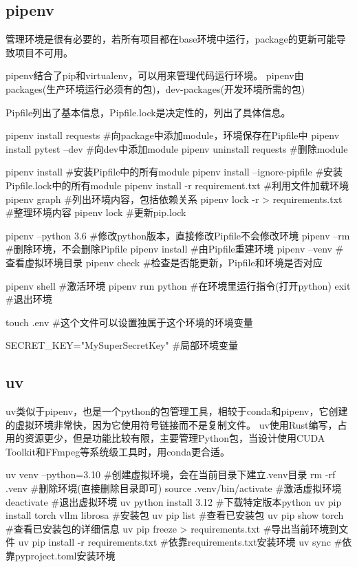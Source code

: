 \subsection{pipenv}
管理环境是很有必要的，若所有项目都在base环境中运行，package的更新可能导致项目不可用。

pipenv结合了pip和virtualenv，可以用来管理代码运行环境。
pipenv由packages(生产环境运行必须有的包)，dev-packages(开发环境所需的包)

Pipfile列出了基本信息，Pipfile.lock是决定性的，列出了具体信息。
\begin{codeblock}[language=python, caption={pipenv}]
  pipenv install requests #向package中添加module，环境保存在Pipfile中
  pipenv install pytest --dev #向dev中添加module
  pipenv uninstall requests #删除module
  
  pipenv install #安装Pipfile中的所有module
  pipenv install --ignore-pipfile #安装Pipfile.lock中的所有module
  pipenv install -r requirement.txt #利用文件加载环境
  pipenv graph #列出环境内容，包括依赖关系
  pipenv lock -r > requirements.txt #整理环境内容
  pipenv lock #更新pip.lock
  
  pipenv --python 3.6 #修改python版本，直接修改Pipfile不会修改环境
  pipenv --rm #删除环境，不会删除Pipfile
  pipenv install #由Pipfile重建环境
  pipenv --venv #查看虚拟环境目录
  pipenv check #检查是否能更新，Pipfile和环境是否对应
  
  pipenv shell #激活环境
  pipenv run python #在环境里运行指令(打开python)
  exit #退出环境 
  
  touch .env #这个文件可以设置独属于这个环境的环境变量
\end{codeblock}

\begin{codeblock}[language=python, caption={.env}]
  SECRET_KEY="MySuperSecretKey" #局部环境变量
\end{codeblock}

\subsection{uv}
uv类似于pipenv，也是一个python的包管理工具，相较于conda和pipenv，它创建的虚拟环境非常快，因为它使用符号链接而不是复制文件。
uv使用Rust编写，占用的资源更少，但是功能比较有限，主要管理Python包，当设计使用CUDA Toolkit和FFmpeg等系统级工具时，用conda更合适。
\begin{codeblock}[language=bash, caption={uv}]
  uv venv --python=3.10 #创建虚拟环境，会在当前目录下建立.venv目录
  rm -rf .venv #删除环境(直接删除目录即可)
  source .venv/bin/activate #激活虚拟环境
  deactivate #退出虚拟环境
  uv python install 3.12 #下载特定版本python
  uv pip install torch vllm librosa #安装包
  uv pip list #查看已安装包
  uv pip show torch #查看已安装包的详细信息
  uv pip freeze > requirements.txt #导出当前环境到文件
  uv pip install -r requirements.txt #依靠requirements.txt安装环境
  uv sync #依靠pyproject.toml安装环境
\end{codeblock}

